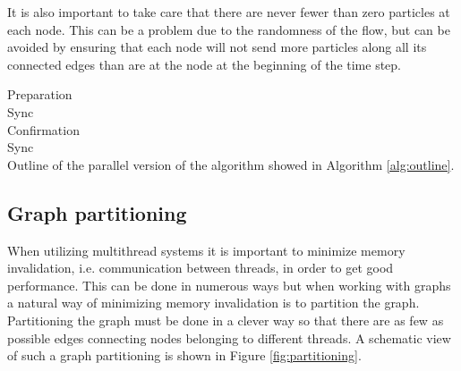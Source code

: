 It is also important to take care that there are never fewer than zero particles at each node. This can be a problem due to the randomness of the flow, but can be avoided by ensuring that each node will not send more particles along all its connected edges than are at the node at the beginning of the time step.

\begin{algorithm}[H]
Preparation\\
Sync\\
Confirmation\\
Sync\\
\caption{Outline of the parallel version of the algorithm showed in Algorithm \ref{alg:outline}.}
\label{alg:parallel}
\end{algorithm}

\subsection{Graph partitioning}
When utilizing multithread systems it is important to minimize memory invalidation, i.e. communication between threads, in order to get good performance. This can be done in numerous ways but when working with graphs a natural way of minimizing memory invalidation is to partition the graph. Partitioning the graph must be done in a clever way so that there are as few as possible edges connecting nodes belonging to different threads. A schematic view of such a graph partitioning is shown in Figure \ref{fig:partitioning}. 

